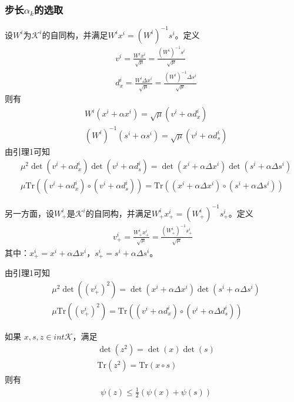         \subsubsection{步长${\alpha}_k$的选取}
            \par
            设$W^i$为$\mathcal{K}^i$的自同构，并满足$W^ix^i=(W^i)^{-1}s^i$。定义
            \begin{align*}
            & v^i=\frac{W^ix^i}{\sqrt{\mu}}=\frac{(W^i)^{-1}s^i}{\sqrt{\mu}}\\
            & d_x^i=\frac{W^i\Delta x^i}{\sqrt{\mu}}=\frac{(W^i)^{-1}\Delta s^i}{\sqrt{\mu}}
            \end{align*}
            则有
            \begin{align*}
            & W^i(x^i+\alpha x^i)={\sqrt{\mu}}(v^i+\alpha d_x^i)\\
            & (W^i)^{-1}(s^i+\alpha s^i)={\sqrt{\mu}}(v^i+\alpha d_s^i)
            \end{align*}
            由引理1可知
            \begin{align*}
            & {\mu}^2\det(v^i+\alpha d_x^i)\det(v^i+\alpha d_s^i)=\det(x^i+\alpha \Delta x^i)\det(s^i+\alpha \Delta s^i)\\
            & {\mu}\mathrm{Tr}((v^i+\alpha d_x^i)\circ (v^i+\alpha d_s^i))=\mathrm{Tr}((x^i+\alpha \Delta x^i)\circ (s^i+\alpha \Delta s^i))
            \end{align*}
            \par
            另一方面，设$W_{+}^i$是$\mathcal{K}^i$的自同构，并满足$W_{+}^ix_{+}^i=(W_{+}^i)^{-1}s_{+}^i$。定义
            \begin{align*}
            v_{+}^i=\frac{W_{+}^ix_{+}^i}{\sqrt{\mu}}=\frac{(W_{+}^i)^{-1}s_{+}^i}{\sqrt{\mu}}
            \end{align*}
            其中：$x_{+}^i=x^i+\alpha\Delta x^i$，$s_{+}^i=s^i+\alpha\Delta s^i$。
            \par
            由引理1可知
            \begin{align*}
            & {\mu}^2\det((v_{+}^i)^2)=\det(x^i+\alpha \Delta x^i)\det(s^i+\alpha \Delta s^i)\\
            & {\mu}\mathrm{Tr}((v_{+}^i)^2) = \mathrm{Tr}((v^i+\alpha d_x^i)\circ (v^i+\alpha \Delta d_s^i))
            \end{align*}
            \begin{lemma}
            如果 $x,s,z\in int{}\mathcal{K}$，满足
            \begin{align*}
            & \det(z^2)=\det(x)\det(s)\\
            & \mathrm{Tr}(z^2) = \mathrm{Tr}(x\circ s)
            \end{align*}
            则有
            \begin{align*}
            & \psi(z)\leqslant \frac 12 (\psi(x)+\psi(s))
            \end{align*}
            \end{lemma}
